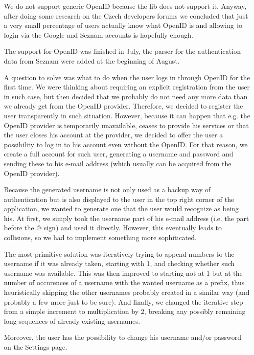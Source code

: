 We do not support generic OpenID because the lib does not support it. Anyway, after doing some research on the Czech developers forums we concluded that just a very small percentage of users actually know what OpenID is and allowing to login via the Google and Seznam accounts is hopefully enough.

The support for OpenID was finished in July, the parser for the authentication data from Seznam were added at the beginning of August.

A question to solve was what to do when the user logs in through OpenID for the first time. We were thinking about requiring an explicit registration from the user in such case, but then decided that we probably do not need any more data than we already get from the OpenID provider. Therefore, we decided to register the user transparently in such situation.
However, because it can happen that e.g. the OpenID provider is temporarily unavailable, ceases to provide his services or that the user closes his account at the provider, we decided to offer the user a possibility to log in to his account even without the OpenID. For that reason, we create a full account for such user, generating a username and password and sending these to his e-mail address (which usually can be acquired from the OpenID provider).

Because the generated username is not only used as a backup way of authentication but is also displayed to the user in the top right corner of the application, we wanted to generate one that the user would recognize as being his. At first, we simply took the username part of his e-mail address (i.e. the part before the @ sign) and used it directly. However, this eventually leads to collisions, so we had to implement something more sophiticated.

The most primitive solution was iteratively trying to append numbers to the username if it was already taken, starting with 1, and checking whether such username was available. This was then improved to starting not at 1 but at the number of occurences of a username with the wanted username as a prefix, thus heuristically skipping the other usernames probably created in a similar way (and probably a few more just to be sure). And finally, we changed the iterative step from a simple increment to multiplication by 2, breaking any possibly remaining long sequences of already existing usernames.

Moreover, the user has the possibility to change his username and/or password on the Settings page.

